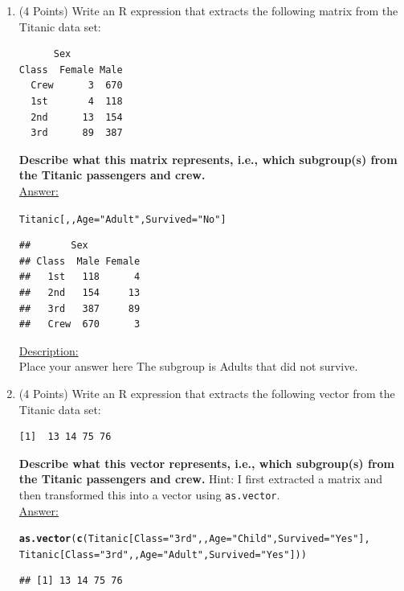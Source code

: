 \documentclass[12pt,letterpaper,final]{article}\usepackage[]{graphicx}\usepackage[]{xcolor}
\makeatletter
\newcommand{\hlstr}[1]{\textcolor[rgb]{0.192,0.494,0.8}{#1}}%
\newcommand{\hlstd}[1]{\textcolor[rgb]{0.345,0.345,0.345}{#1}}%
\newcommand{\hlkwc}[1]{\textcolor[rgb]{0.333,0.667,0.333}{#1}}%
\newcommand{\hlkwd}[1]{\textcolor[rgb]{0.737,0.353,0.396}{\textbf{#1}}}%
\newenvironment{kframe}{%
 \def\at@end@of@kframe{}%
 \ifinner\ifhmode%
  \def\at@end@of@kframe{\end{minipage}}%
  \begin{minipage}{\columnwidth}%
 \fi\fi%
 \def\FrameCommand##1{\hskip\@totalleftmargin \hskip-\fboxsep
 \colorbox{shadecolor}{##1}\hskip-\fboxsep
     \hskip-\linewidth \hskip-\@totalleftmargin \hskip\columnwidth}%
 \MakeFramed {\advance\hsize-\width
   \@totalleftmargin\z@ \linewidth\hsize
   \@setminipage}}%
 {\par\unskip\endMakeFramed%
 \at@end@of@kframe}
\newenvironment{knitrout}{}{} %
\makeatother
\begin{document}
\begin{enumerate}
\begin{enumerate}
\item (4 Points)
Write an R expression that extracts the following matrix from the Titanic data set:
\begin{verbatim}
      Sex
Class  Female Male
  Crew      3  670
  1st       4  118
  2nd      13  154
  3rd      89  387
\end{verbatim}
{\bf Describe what this matrix represents, i.e., which subgroup(s) from the Titanic 
passengers and crew.} \\

\underline{Answer:}
\begin{knitrout}
\color{fgcolor}\begin{kframe}
\begin{alltt}
\hlstd{Titanic[,,} \hlkwc{Age} \hlstd{=} \hlstr{"Adult"}\hlstd{,}\hlkwc{Survived}\hlstd{=}\hlstr{"No"}\hlstd{]}
\end{alltt}
\begin{verbatim}
##       Sex
## Class  Male Female
##   1st   118      4
##   2nd   154     13
##   3rd   387     89
##   Crew  670      3
\end{verbatim}
\end{kframe}
\end{knitrout}

\underline{Description:} \\
Place your answer here
The subgroup is Adults that did not survive. 

\item (4 Points)
Write an R expression that extracts the following vector from the Titanic data set:
\begin{verbatim}
[1]  13 14 75 76
\end{verbatim}
{\bf Describe what this vector represents, i.e., which subgroup(s) from the Titanic 
passengers and crew.}
Hint: I first extracted a matrix and then transformed this into a 
vector using \verb|as.vector|. \\

\underline{Answer:}
\begin{knitrout}
\color{fgcolor}\begin{kframe}
\begin{alltt}
\hlkwd{as.vector}\hlstd{(}\hlkwd{c}\hlstd{(Titanic[}\hlkwc{Class}\hlstd{=}\hlstr{"3rd"}\hlstd{, ,}\hlkwc{Age}\hlstd{=}\hlstr{"Child"}\hlstd{,} \hlkwc{Survived} \hlstd{=} \hlstr{"Yes"}\hlstd{],}
            \hlstd{Titanic[}\hlkwc{Class}\hlstd{=}\hlstr{"3rd"}\hlstd{, ,}\hlkwc{Age}\hlstd{=}\hlstr{"Adult"}\hlstd{,} \hlkwc{Survived} \hlstd{=} \hlstr{"Yes"}\hlstd{]))}
\end{alltt}
\begin{verbatim}
## [1] 13 14 75 76
\end{verbatim}
\end{kframe}
\end{knitrout}


\end{enumerate}
\end{enumerate}
\end{document}
